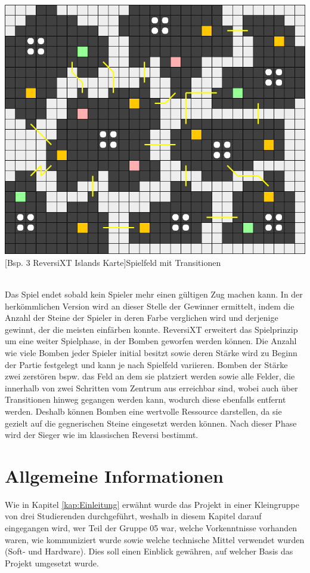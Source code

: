 \documentclass[12pt,a4paper,bibliography=totocnumbered,listof=totocnumbered]{article}
\begin{document}
\vspace{1em}
\begin{minipage}{\linewidth}
	\centering
	\includegraphics[width=0.7\linewidth]{pics/reversixt_islands_map.png}
	[Bsp. 3 ReversiXT Islands Karte]{Spielfeld mit Transitionen}
	\label{fig:reversixt_islands_map}
\end{minipage}
\\


Das Spiel endet sobald kein Spieler mehr einen gültigen Zug machen kann. In der herkömmlichen Version wird an dieser Stelle der Gewinner ermittelt, indem die Anzahl der Steine der Spieler in deren Farbe verglichen wird und derjenige gewinnt, der die meisten einfärben konnte. ReversiXT erweitert das Spielprinzip um eine weiter Spielphase, in der Bomben geworfen werden können. Die Anzahl wie viele Bomben jeder Spieler initial besitzt sowie deren Stärke wird zu Beginn der Partie festgelegt und kann je nach Spielfeld variieren. Bomben der Stärke zwei zerstören bspw. das Feld an dem sie platziert werden sowie alle Felder, die innerhalb von zwei Schritten vom Zentrum aus erreichbar sind, wobei auch über Transitionen hinweg gegangen werden kann, wodurch diese ebenfalls entfernt werden. Deshalb können Bomben eine wertvolle Ressource darstellen, da sie gezielt auf die gegnerischen Steine eingesetzt werden können. Nach dieser Phase wird der Sieger wie im klassischen Reversi bestimmt.


\newpage
\section{Allgemeine Informationen}
Wie in Kapitel \ref{kap:Einleitung} erwähnt wurde das Projekt in einer Kleingruppe von drei Studierenden durchgeführt, weshalb in diesem Kapitel darauf eingegangen wird, wer Teil der Gruppe 05 war, welche Vorkenntnisse vorhanden waren, wie kommuniziert wurde sowie welche technische Mittel verwendet wurden (Soft- und Hardware). Dies soll einen Einblick gewähren, auf welcher Basis das Projekt umgesetzt wurde.
\end{document}
